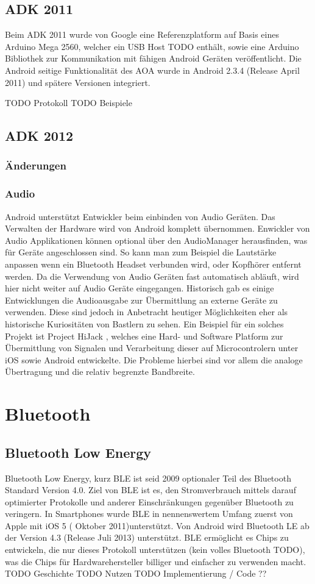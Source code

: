 \documentclass[12pt,journal,compsoc]{IEEEtran}
\begin{document}
\subsection{ADK 2011}
Beim ADK 2011 wurde von Google eine
Referenzplatform auf Basis eines Arduino Mega 2560, welcher ein USB Host TODO enthält, sowie eine Arduino Bibliothek zur Kommunikation mit fähigen Android Geräten veröffentlicht.
Die Android seitige Funktionalität des AOA wurde in Android 2.3.4 (Release April 2011) und spätere Versionen integriert. 

TODO Protokoll
TODO Beispiele
\subsection{ADK 2012}
\subsubsection{Änderungen}

\subsubsection{Audio}
Android unterstützt Entwickler beim einbinden von Audio Geräten. Das Verwalten der Hardware wird von Android komplett übernommen.
Enwickler von Audio Applikationen können optional über den AudioManager herausfinden, was für Geräte angeschlossen sind. So kann man zum Beispiel die Lautstärke anpassen wenn ein Bluetooth Headset verbunden wird, oder Kopfhörer entfernt werden.
Da die Verwendung von Audio Geräten fast automatisch abläuft, wird hier nicht weiter auf Audio Geräte eingegangen.
Historisch gab es einige Entwicklungen die Audioausgabe zur Übermittlung an externe Geräte zu verwenden. Diese sind jedoch in Anbetracht heutiger Möglichkeiten eher als historische Kuriositäten von Bastlern zu sehen.
Ein Beispiel für ein solches Projekt ist Project HiJack \cite{hijack} , welches eine Hard- und Software Platform zur Übermittlung von Signalen und Verarbeitung dieser auf Microcontrolern unter iOS sowie Android entwickelte.
Die Probleme hierbei sind vor allem die analoge Übertragung und die relativ begrenzte Bandbreite.
\section{Bluetooth}
\subsection{Bluetooth Low Energy}
Bluetooth Low Energy, kurz BLE ist seid 2009 optionaler Teil des Bluetooth Standard Version 4.0. 
Ziel von BLE ist es, den Stromverbrauch mittels darauf optimierter Protokolle und anderer Einschränkungen gegenüber Bluetooth zu veringern.
In Smartphones wurde BLE in nennenswertem Umfang zuerst von Apple mit iOS 5 ( Oktober 2011)unterstützt.
Von Android wird Bluetooth LE ab der Version 4.3 (Release Juli 2013) unterstützt.
BLE ermöglicht es Chips zu entwickeln, die nur dieses Protokoll unterstützen (kein volles Bluetooth TODO), was die Chips für Hardwarehersteller billiger und einfacher zu verwenden macht.
TODO Geschichte
TODO Nutzen
TODO Implementierung / Code ??
\end{document}
